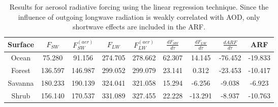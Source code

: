 \documentclass[12pt]{article}
\newcommand\T{\rule{0pt}{2.6ex}}       %
\newcommand\B{\rule[-1.2ex]{0pt}{0pt}} %
\begin{document}
    \begin{table}[h!]\label{}
        \centering
        \begin{tabular}{c | c c | c c | c c | c c}
            Surface & $F_{SW} $ & $F^{(aer)}_{SW} $ & $F_{LW}$ & $F^{(aer)}_{LW}$ &$\frac{dF_{SW}}{d\tau}$ & $\frac{dF_{LW}}{d\tau}$ & $\frac{dARF}{d\tau}$ & ARF \B\\
            \hline
            Ocean & 75.280 & 91.156 & 274.705 & 278.662 & 62.307 & 14.145 & -76.452 & -19.833 \T\\
            Forest & 136.597 & 146.987 & 299.052 & 299.079 & 23.141 & 0.312 & -23.453 & -10.417 \\
            Savanna & 180.233 & 190.139 & 324.041 & 321.058 & 15.294 & -6.256 & -9.038 & -6.923 \\
            Shrub & 156.140 & 170.537 & 331.089 & 327.455 & 22.228 & -13.291 & -8.937 & -10.763 \\
        \end{tabular}
        \caption{Results for aerosol radiative forcing using the linear regression technique.  Since the influence of outgoing longwave radiation is weakly correlated with AOD, only shortwave effects are included in the ARF.}
    \end{table}

    \clearpage
\end{document}
